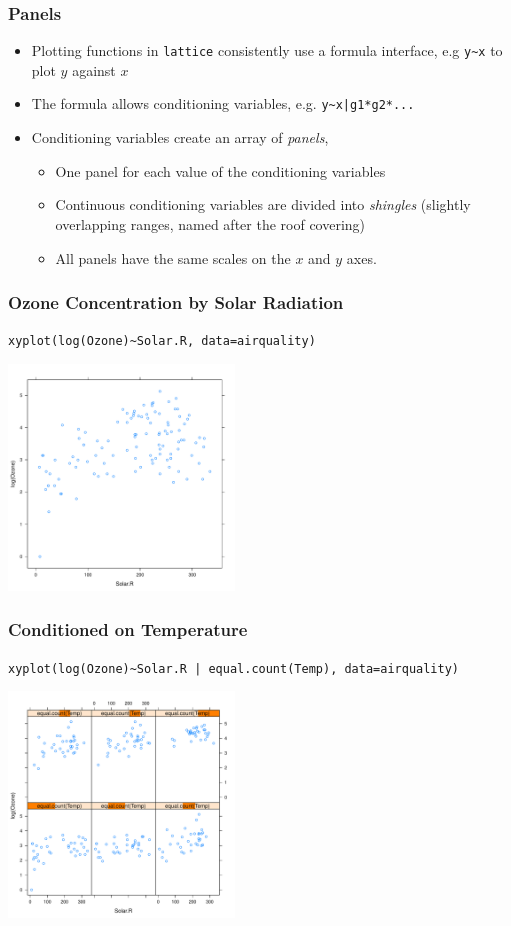 \documentclass[xcolor=svgnames]{beamer}
\newcommand{\code}[1]{\texttt{#1}}
\begin{document}
\begin{frame}
   \frametitle{Panels}

   \begin{itemize}
   \item Plotting functions in \code{lattice} consistently use a formula
      interface, e.g \code{y\textasciitilde x} to plot $y$ against $x$
   \item The formula allows conditioning variables, e.g. 
      \code{y\textasciitilde x|g1*g2*...}
   \item Conditioning variables create an array of {\em panels}, 
      \begin{itemize}
      \item One panel for each value of the conditioning variables
      \item Continuous conditioning variables are divided into 
      {\em shingles} (slightly overlapping ranges, named after the roof covering)
      \item All panels have the same scales on the $x$ and $y$ axes.
      \end{itemize}
   \end{itemize}     

\end{frame}

\begin{frame}
   \frametitle{Ozone Concentration by Solar Radiation}
   \code{xyplot(log(Ozone)\textasciitilde Solar.R, data=airquality)}

   \centerline{\includegraphics[width=6cm]{ozone1.pdf}}
\end{frame}

\begin{frame}[fragile]
   \frametitle{Conditioned on Temperature}
   \code{xyplot(log(Ozone)\textasciitilde Solar.R | equal.count(Temp), data=airquality)}

   \centerline{\includegraphics[width=6cm]{ozone2.pdf}}
\end{frame}
\end{document}
